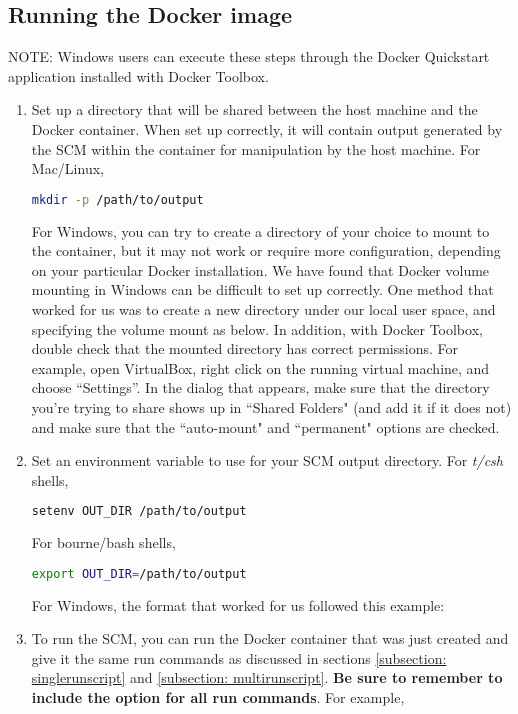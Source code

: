 \subsection{Running the Docker image}

NOTE: Windows users can execute these steps through the Docker Quickstart application installed with Docker Toolbox.

\begin{enumerate}
\item Set up a directory that will be shared between the host machine and the Docker container. When set up correctly, it will contain output generated by the SCM within the container for manipulation by the host machine. For Mac/Linux,
\begin{lstlisting}[language=bash]
mkdir -p /path/to/output
\end{lstlisting}
For Windows, you can try to create a directory of your choice to mount to the container, but it may not work or require more configuration, depending on your particular Docker installation. We have found that Docker volume mounting in Windows can be difficult to set up correctly. One method that worked for us was to create a new directory under our local user space, and specifying the volume mount as below. In addition, with Docker Toolbox, double check that the mounted directory has correct permissions. For example, open VirtualBox, right click on the running virtual machine, and choose ``Settings''. In the dialog that appears, make sure that the directory you're trying to share shows up in ``Shared Folders" (and add it if it does not) and make sure that the ``auto-mount" and ``permanent" options are checked.
\item Set an environment variable to use for your SCM output directory. For \textit{t/csh} shells,
\begin{lstlisting}[language=bash]
setenv OUT_DIR /path/to/output
\end{lstlisting}
For bourne/bash shells,
\begin{lstlisting}[language=bash]
export OUT_DIR=/path/to/output
\end{lstlisting}
For Windows, the format that worked for us followed this example: 
\item To run the SCM, you can run the Docker container that was just created and give it the same run commands as discussed in sections \ref{subsection: singlerunscript} and \ref{subsection: multirunscript}. \textbf{Be sure to remember to include the  option for all run commands}. For example,

\end{enumerate}
